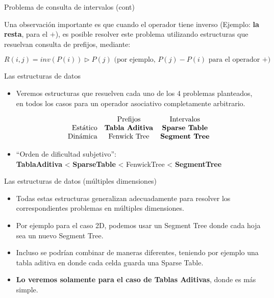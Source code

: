 \documentclass{beamer}
\begin{document}
\begin{frame}{Problema de consulta de intervalos (cont)}

  Una observación importante es que cuando el operador tiene inverso (Ejemplo: \textbf{la resta}, para el $+$), es posible resolver este problema
         utilizando estructuras que resuelvan consulta de prefijos, mediante:

         $$ R(i,j) = inv(P(i)) \triangleright P(j) \mbox{ (por ejemplo, } P(j) - P(i) \mbox{ para el operador +})$$

\end{frame}

\begin{frame}{Las estructuras de datos}

  \begin{itemize}
      \item Veremos estructuras que resuelven cada uno de los 4 problemas planteados, en todos los casos para un operador asociativo completamente arbitrario.

       $$\begin{array}{rcc}
                    & \mbox{Prefijos}       & \mbox{Intervalos} \\
           \mbox{Estático} & \mbox{\textbf{Tabla Aditiva}}  & \mbox{\textbf{Sparse Table}} \\
           \mbox{Dinámica} & \mbox{Fenwick Tree}   & \mbox{\textbf{Segment Tree}} \\
         \end{array}$$

      \item ``Orden de dificultad subjetivo'': \\ \textbf{TablaAditiva} < \textbf{SparseTable} < FenwickTree < \textbf{SegmentTree}

  \end{itemize}

\end{frame}

\begin{frame}{Las estructuras de datos (múltiples dimensiones)}

  \begin{itemize}
      \item Todas estas estructuras generalizan adecuadamente para resolver los correspondientes problemas en múltiples dimensiones.
      \item Por ejemplo para el caso 2D, podemos usar un Segment Tree donde cada hoja sea un nuevo Segment Tree.
      \item Incluso se podrían combinar de maneras diferentes, teniendo por ejemplo una tabla aditiva en donde cada celda guarda una Sparse Table.
      \item \textbf{Lo veremos solamente para el caso de Tablas Aditivas}, donde es más simple.
  \end{itemize}

\end{frame}
\end{document}
